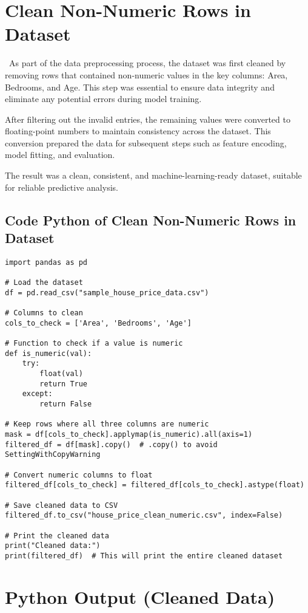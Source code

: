 \documentclass[12pt, a4paper]{report}
\begin{document}
\section{Clean Non-Numeric Rows in Dataset}\
As part of the data preprocessing process, the dataset was first cleaned by removing rows that contained non-numeric values in the key columns: Area, Bedrooms, and Age. This step was essential to ensure data integrity and eliminate any potential errors during model training.

After filtering out the invalid entries, the remaining values were converted to floating-point numbers to maintain consistency across the dataset. This conversion prepared the data for subsequent steps such as feature encoding, model fitting, and evaluation.

The result was a clean, consistent, and machine-learning-ready dataset, suitable for reliable predictive analysis.


\subsection*{Code Python of Clean Non-Numeric Rows in Dataset}

\begin{lstlisting}[style=pythonstyle]
import pandas as pd

# Load the dataset
df = pd.read_csv("sample_house_price_data.csv")

# Columns to clean
cols_to_check = ['Area', 'Bedrooms', 'Age']

# Function to check if a value is numeric
def is_numeric(val):
    try:
        float(val)
        return True
    except:
        return False

# Keep rows where all three columns are numeric
mask = df[cols_to_check].applymap(is_numeric).all(axis=1)
filtered_df = df[mask].copy()  # .copy() to avoid SettingWithCopyWarning

# Convert numeric columns to float
filtered_df[cols_to_check] = filtered_df[cols_to_check].astype(float)

# Save cleaned data to CSV
filtered_df.to_csv("house_price_clean_numeric.csv", index=False)

# Print the cleaned data
print("Cleaned data:")
print(filtered_df)  # This will print the entire cleaned dataset
\end{lstlisting}
\newpage
\section*{Python Output (Cleaned Data)}
\end{document}

